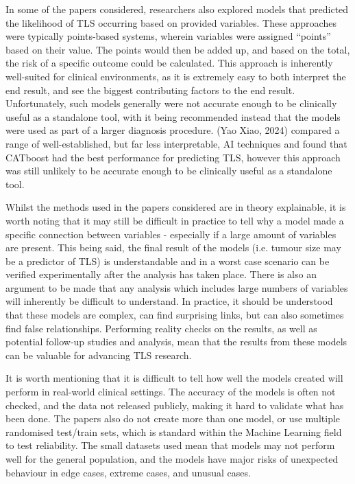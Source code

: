 \documentclass{article}
\begin{document}
In some of the papers considered, researchers also explored models that predicted the likelihood of TLS occurring based on provided variables. These approaches were typically points-based systems, wherein variables were assigned “points” based on their value. The points would then be added up, and based on the total, the risk of a specific outcome could be calculated. This approach is inherently well-suited for clinical environments, as it is extremely easy to both interpret the end result, and see the biggest contributing factors to the end result. Unfortunately, such models generally were not accurate enough to be clinically useful as a standalone tool, with it being recommended instead that the models were used as part of a larger diagnosis procedure. (Yao Xiao, 2024) compared a range of well-established, but far less interpretable, AI techniques and found that CATboost had the best performance for predicting TLS, however this approach was still unlikely to be accurate enough to be clinically useful as a standalone tool.

Whilst the methods used in the papers considered are in theory explainable, it is worth noting that it may still be difficult in practice to tell why a model made a specific connection between variables - especially if a large amount of variables are present. This being said, the final result of the models (i.e. tumour size may be a predictor of TLS) is understandable and in a worst case scenario can be verified experimentally after the analysis has taken place. There is also an argument to be made that any analysis which includes large numbers of variables will inherently be difficult to understand. In practice, it should be understood that these models are complex, can find surprising links, but can also sometimes find false relationships. Performing reality checks on the results, as well as potential follow-up studies and analysis, mean that the results from these models can be valuable for advancing TLS research.

It is worth mentioning that it is difficult to tell how well the models created will perform in real-world clinical settings. The accuracy of the models is often not checked, and the data  not released publicly, making it hard to validate what has been done. The papers also  do not create more than one model, or use multiple randomised test/train sets, which is standard within the Machine Learning field to test reliability. The small datasets used mean that models may not perform well for the general population, and the models have major risks of unexpected behaviour in edge cases, extreme cases, and unusual cases.
\end{document}
